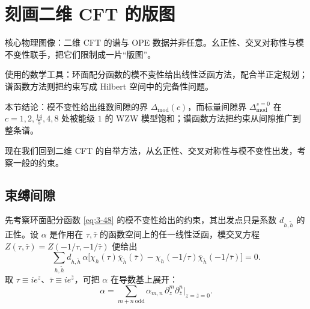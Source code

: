 
\section{刻画二维 CFT 的版图}\label{sec:5}

\begin{keytakeaways}
  \item 核心物理图像：二维 CFT 的谱与 OPE 数据并非任意。幺正性、交叉对称性与模不变性联手，把它们限制成一片“版图”。
  \item 使用的数学工具：环面配分函数的模不变性给出线性泛函方法，配合半正定规划；谱函数方法则把约束写成 Hilbert 空间中的完备性问题。
  \item 本节结论：模不变性给出维数间隙的界 $\Delta_{\mathrm{mod}}(c)$，而标量间隙界 $\Delta_{\mathrm{mod}}^{s=0}$ 在 $c=1,2,\frac{14}{5},4,8$ 处被能级 $1$ 的 WZW 模型饱和；谱函数方法把约束从间隙推广到整条谱。
\end{keytakeaways}

现在我们回到二维 CFT 的自举方法，从幺正性、交叉对称性与模不变性出发，考察一般的约束。

\subsection{束缚间隙}\label{sec:5-1}

先考察环面配分函数 \eqref{eq:3-48} 的模不变性给出的约束，其出发点只是系数 $d_{h,\tilde h}$ 的正性。设 $\alpha$ 是作用在 $\tau,\bar\tau$ 的函数空间上的任一线性泛函，模交叉方程 $Z(\tau,\bar\tau)=Z(-1/\tau,-1/\bar\tau)$ 便给出
\begin{equation}
  \label{eq:5-1}
  \sum_{h,\tilde h} d_{h,\tilde h}\,\alpha\bigl[\chi_h(\tau)\bar\chi_{\tilde h}(\bar\tau)
  -\chi_h(-1/\tau)\bar\chi_{\tilde h}(-1/\bar\tau)\bigr]=0 .
\end{equation}
取 $\tau\equiv ie^{z}$、$\bar\tau\equiv ie^{\bar z}$，可把 $\alpha$ 在导数基上展开：
\begin{equation}
  \label{eq:5-2}
  \alpha=\sum_{m+n\ \text{odd}}\alpha_{m,n}\,\partial_z^m\partial_{\bar z}^n\big|_{z=\bar z=0} .
\end{equation}

